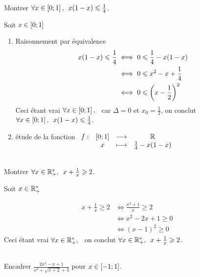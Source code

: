 \begin{exoex}
	Montrer \(\quantifs{\forall x \in \intervii{0}{1}} x(1-x) \leq \frac{1}{4}\).
\end{exoex}

\begin{corr}[2 Méthode]
	Soit \(x \in \left[0;1\right] \)
	\begin{enumerate}
		\item Raisonnement par équivalence
		      \[\begin{aligned}
				      x(1-x) \leqslant \frac{1}{4} & \iff 0 \leqslant \frac{1}{4}-x(1-x)     \\
				                              & \iff 0\leqslant x^2 -x +  \frac{1}{4}   \\
				                              & \iff 0\leqslant\left(x- \frac{1}{2}\right)^2
			      \end{aligned}
		      \]
		      Ceci étant vrai \(\quantifs{\forall x\in \intervii{0}{1}}\) car \(\Delta = 0\) et \(x_0 =  \frac{1}{2}\), on conclut \(\quantifs{\forall x \in \intervii{0}{1}} x(1-x) \leq \frac{1}{4}\).\\
		\item étude de la fonction \(\begin{array}[t]{cccc}f : & \left[0;1\right] & \longrightarrow & \mathbb{R} \\ & x & \longmapsto & \frac{1}{4}-x(1-x)\end{array}\)\\
	\end{enumerate}
\end{corr}


\begin{exoex}
    ~\\
	Montrer \(\quantifs{\forall x \in \Rps} x+\frac{1}{x}\geq 2\).
\end{exoex}

\begin{corr}
	Soit \(x \in \mathbb{R}_+^* \)

	\[\begin{aligned}
			x+\frac{1}{x}\geq 2 & \iff \frac{x^2+1}{x}\geq 2 \\
			                    & \iff x^2-2x+1\geq    0     \\
			                    & \iff (x-1)^2 \geq 0
		\end{aligned}
	\]
	Ceci étant vrai \(\quantifs{\forall x\in \Rps}\) on conclut \(\quantifs{\forall x \in \Rps} x+\frac{1}{x}\geq 2\).
\end{corr}

\begin{exoex}
    ~\\
	Encadrer \(\frac{2x^2-x+1}{x^2+\sqrt{x+2}+3}\) pour \(x \in \left[-1;1\right]\).
\end{exoex}

